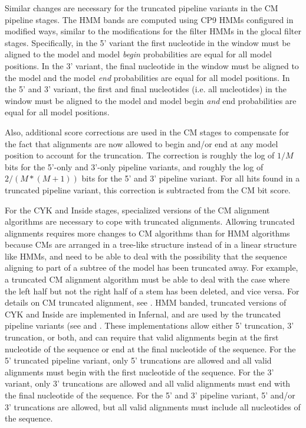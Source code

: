 Similar changes are necessary for the truncated pipeline variants in
the CM pipeline stages. The HMM bands are computed using CP9 HMMs
configured in modified ways, similar to the modifications for the
filter HMMs in the glocal filter stages. Specifically, in the 5'
variant the first nucleotide in the window must be aligned to the
model and model \emph{begin} probabilities are equal for all model
positions. In the 3' variant, the final nucleotide in the window must
be aligned to the model and the model \emph{end} probabilities are
equal for all model positions. In the 5' and 3' variant, the first and
final nucleotides (i.e. all nucleotides) in the window must be aligned
to the model and model begin \emph{and} end probabilities are equal
for all model positions.

Also, additional score corrections are used in the CM stages to
compensate for the fact that alignments are now allowed to begin
and/or end at any model position to account for the truncation. The
correction is roughly the log of $1/M$ bits for the 5'-only and
3'-only pipeline variants, and roughly the log of $2/(M*(M+1))$ bits
for the 5' and 3' pipeline variant. For all hits found in a truncated
pipeline variant, this correction is subtracted from the CM bit score. 

For the CYK and Inside stages, specialized versions of the CM
alignment algorithms are necessary to cope with truncated
alignments. Allowing truncated alignments requires more changes to CM
algorithms than for HMM algorithms because CMs are arranged in a
tree-like structure instead of in a linear structure like HMMs, and
need to be able to deal with the possibility that the sequence
aligning to part of a subtree of the model has been truncated
away. For example, a truncated CM alignment algorithm must be able to
deal with the case where the left half but not the right half of a
stem has been deleted, and vice versa. For details on CM truncated
alignment, see \citep{KolbeEddy09}. HMM banded, truncated versions of
CYK and Inside are implemented in Infernal, and are used by the
truncated pipeline variants (see  and
. These implementations allow either 5'
truncation, 3' truncation, or both, and can require that valid
alignments begin at the first nucleotide of the sequence or end at the
final nucleotide of the sequence.  For the 5' truncated pipeline
variant, only 5' truncations are allowed and all valid alignments must
begin with the first nucleotide of the sequence. For the 3' variant,
only 3' truncations are allowed and all valid alignments must end with
the final nucleotide of the sequence. For the 5' and 3' pipeline
variant, 5' and/or 3' truncations are allowed, but all valid
alignments must include all nucleotides of the sequence.

